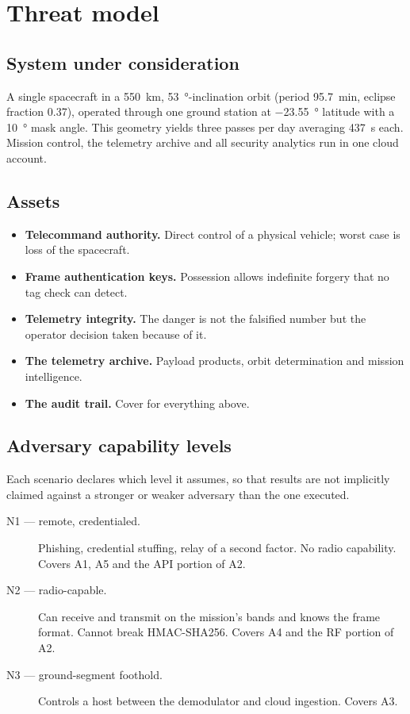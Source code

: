 \section{Threat model}

\subsection{System under consideration}

A single spacecraft in a \SI{550}{\kilo\metre}, \SI{53}{\degree}-inclination
orbit (period \SI{95.7}{\minute}, eclipse fraction \num{0.37}), operated through
one ground station at \SI{-23.55}{\degree} latitude with a
\SI{10}{\degree} mask angle. This geometry yields three passes per day averaging
\SI{437}{\second} each. Mission control, the telemetry archive and all security
analytics run in one cloud account.

\subsection{Assets}

\begin{itemize}
\item \textbf{Telecommand authority.} Direct control of a physical vehicle;
worst case is loss of the spacecraft.
\item \textbf{Frame authentication keys.} Possession allows indefinite forgery
that no tag check can detect.
\item \textbf{Telemetry integrity.} The danger is not the falsified number but
the operator decision taken because of it.
\item \textbf{The telemetry archive.} Payload products, orbit determination and
mission intelligence.
\item \textbf{The audit trail.} Cover for everything above.
\end{itemize}

\subsection{Adversary capability levels}

Each scenario declares which level it assumes, so that results are not
implicitly claimed against a stronger or weaker adversary than the one executed.

\begin{description}
\item[N1 --- remote, credentialed.] Phishing, credential stuffing, relay of a
second factor. No radio capability. Covers A1, A5 and the API portion of A2.
\item[N2 --- radio-capable.] Can receive and transmit on the mission's bands and
knows the frame format. Cannot break HMAC-SHA256. Covers A4 and the RF portion
of A2.
\item[N3 --- ground-segment foothold.] Controls a host between the demodulator
and cloud ingestion. Covers A3.
\end{description}

